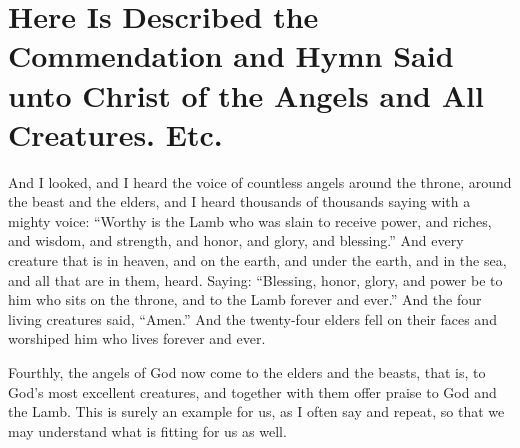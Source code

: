 \chapter[Sermon 29. Here Is Described the Commendation and Hymn Said unto Christ of the Angels and All Creatures. Etc.]{Here Is Described the Commendation and Hymn Said unto Christ of the Angels and All Creatures. Etc.}
\label{sermon:029}

And I looked, and I heard the voice of countless angels around the throne, around the beast and the elders, and I heard thousands of thousands saying with a mighty voice: “Worthy is the Lamb who was slain to receive power, and riches, and wisdom, and strength, and honor, and glory, and blessing.” And every creature that is in heaven, and on the earth, and under the earth, and in the sea, and all that are in them, heard. Saying: “Blessing, honor, glory, and power be to him who sits on the throne, and to the Lamb forever and ever.” And the four living creatures said, “Amen.” And the twenty-four elders fell on their faces and worshiped him who lives forever and ever.

Fourthly, the angels of God now come to the elders and the beasts, that is, to God’s most excellent creatures, and together with them offer praise to God and the Lamb. This is surely an example for us, as I often say and repeat, so that we may understand what is fitting for us as well.

